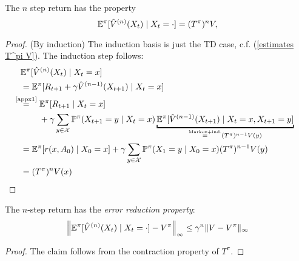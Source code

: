 \begin{lemma} The \(n\) step return has the property
	\[
		\mathbb{E}^\pi[ \hat{V}^{(n)}(X_t)\mid X_t=\cdot]=(T^\pi)^n V,
	\]
\end{lemma}
\begin{proof}
	(By induction) The induction basis is just the TD case, c.f. (\ref{estimates T^pi V}). The induction step follows:
	\begin{align*}
		&\E^\pi[ \hat{V}^{(n)}(X_t)\mid X_t=x]\\
		&=\E^\pi[R_{t+1}+\gamma\hat{V}^{(n-1)}(X_{t+1})\mid X_t=x]\\
		&\lxeq{\text{\ref{appx1}}}
		\begin{aligned}[t]
			&\E^\pi[R_{t+1}\mid X_t=x] \\
			&+ \gamma\sum_{y\in\cX} \Pr^\pi(X_{t+1}=y\mid X_t=x) 
			\underbracket[1pt]{\E^\pi[\hat{V}^{(n-1)}(X_{t+1})\mid X_t=x,X_{t+1}=y]}_{
				\xeq{\text{Markov+ind.}} (T^\pi)^{n-1} V(y)
			}
		\end{aligned}\\
		&=\E^\pi[r(x,A_0)\mid X_0=x] 
		+\gamma\sum_{y\in\cX} \Pr^\pi(X_{1}=y\mid X_0=x)(T^\pi)^{n-1} V(y)\\
		&=(T^\pi)^n V(x) \qedhere
	\end{align*}
\end{proof}
\begin{corollary}\label{error reduction} The \(n\)-step return has the \emph{error reduction property}:
	\[
		\left\| \mathbb{E}^\pi[ \hat{V}^{(n)}(X_t)\mid X_t=\cdot] - V^\pi\right\|_\infty \le \gamma^n \| V-V^\pi\|_\infty
	\]
\end{corollary}
\begin{proof}
	The claim follows from the contraction property of \(T^\pi\).
\end{proof}

